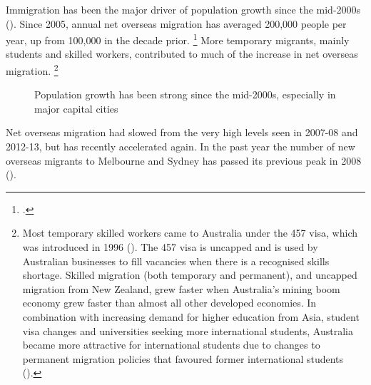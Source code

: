 Immigration has been the major driver of population growth since the mid-2000s ().
Since 2005, annual net overseas migration has averaged 200,000 people per year, up from 100,000 in the decade prior.
    \footcite{ABS-2016-Aust-Demographic-stats}
More temporary migrants, mainly students and skilled workers, contributed to much of the increase in net overseas migration.%
    \footnote{Most temporary skilled workers came to Australia under the 457 visa, which was introduced in 1996 (\textcite[][11]{Philipsmigrationstats2010}).
    The 457 visa is uncapped and is used by Australian businesses to fill vacancies when there is a recognised skills shortage. Skilled migration (both temporary and permanent), and uncapped migration from New Zealand, grew faster when Australia's mining boom economy grew faster than almost all other developed economies.  
    In combination with  increasing demand for higher education from Asia, student visa changes and universities seeking more international students, Australia became more attractive for international students due to changes to permanent migration policies that favoured former international students (\textcite[][23]{Norton2016MappingAustralianhigher}).}

\begin{figure}
\caption{Population growth has been strong since the mid-2000s, especially in major capital cities}\label{fig:pop-growth-cities}
%
{\textcites{ABS-2017-AustDemographicstats}{ABS-2017-regionalpopgrowth}}
\end{figure}

Net overseas migration had slowed from the very high levels seen in 2007-08 and 2012-13, but has recently accelerated again. In the past year the number of new overseas migrants to Melbourne and Sydney has passed its previous peak in 2008 ().

